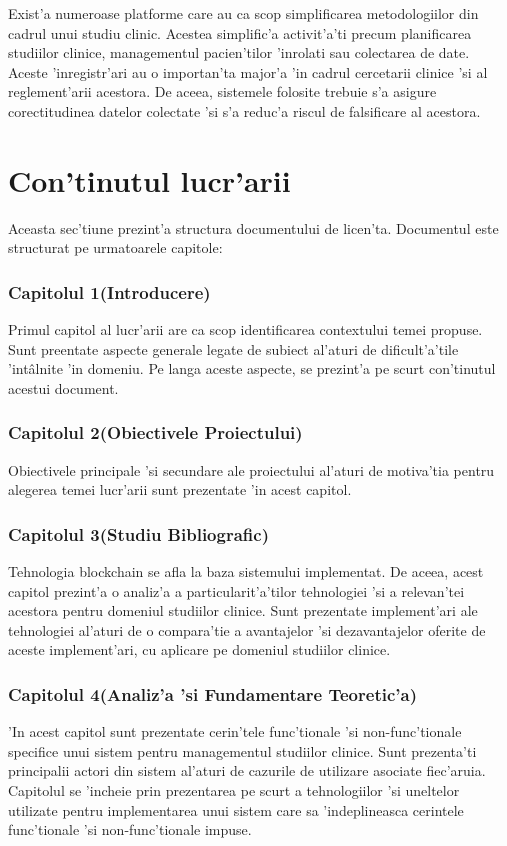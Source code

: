 \documentclass[12pt,a4paper,twoside]{report}
\begin{document}
    Exist'a numeroase platforme care au ca scop simplificarea metodologiilor din cadrul unui studiu clinic. Acestea simplific'a activit'a'ti precum planificarea studiilor clinice, managementul pacien'tilor 'inrolati sau colectarea de date. Aceste 'inregistr'ari au o importan'ta major'a 'in cadrul cercetarii clinice 'si al reglement'arii acestora. De aceea, sistemele folosite trebuie s'a asigure corectitudinea datelor colectate 'si s'a reduc'a riscul de falsificare al acestora.
    
\section{Con'tinutul lucr'arii}
    
    Aceasta sec'tiune prezint'a structura documentului de licen'ta. Documentul este structurat pe urmatoarele capitole:
    
    \subsubsection{Capitolul 1(Introducere)}
    Primul capitol al lucr'arii are ca scop identificarea contextului temei propuse. Sunt preentate aspecte generale legate de subiect al'aturi de dificult'a'tile 'int\^alnite 'in domeniu. Pe langa aceste aspecte, se prezint'a pe scurt con'tinutul acestui document.
    
    \subsubsection{Capitolul 2(Obiectivele Proiectului)}
    Obiectivele principale 'si secundare ale proiectului al'aturi de motiva'tia pentru alegerea temei lucr'arii sunt prezentate 'in acest capitol.
    
    \subsubsection{Capitolul 3(Studiu Bibliografic)}
    Tehnologia blockchain se afla la baza sistemului implementat. De aceea, acest capitol prezint'a o analiz'a a particularit'a'tilor tehnologiei 'si a relevan'tei acestora pentru domeniul studiilor clinice. Sunt prezentate implement'ari ale tehnologiei al'aturi de o compara'tie a avantajelor 'si dezavantajelor oferite de aceste implement'ari, cu aplicare pe domeniul studiilor clinice.
    
    \subsubsection{Capitolul 4(Analiz'a 'si Fundamentare Teoretic'a)}
    'In acest capitol sunt prezentate cerin'tele func'tionale 'si non-func'tionale specifice unui sistem pentru managementul studiilor clinice. Sunt prezenta'ti principalii actori din sistem al'aturi de cazurile de utilizare asociate fiec'aruia. Capitolul se 'incheie prin prezentarea pe scurt a tehnologiilor 'si uneltelor utilizate pentru implementarea unui sistem care sa 'indeplineasca cerintele func'tionale 'si non-func'tionale impuse.
    
\end{document}
